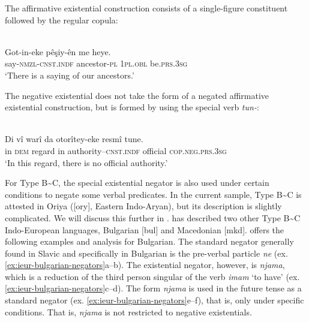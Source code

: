 \documentclass[output=paper,colorlinks,citecolor=brown]{langscibook}
\begin{document}
%
The affirmative existential construction consists of a single-figure constituent followed by the regular copula:
%
\begin{exe}\ex\label{ex:ieur-kurmanji-ancestors}
\\
    \gll Got-in-eke pêşiy-ên      me   heye.  \\
say-\textsc{nmzl}-\textsc{cnst.}\textsc{indf} ancestor-\textsc{pl} \textsc{1pl.obl}   be.\textsc{prs.3sg} \\
    \glt `There is a saying of our ancestors.' 
    \end{exe}
%
The negative existential does not take the form of a negated affirmative existential construction, but is formed by using the special verb \textit{tun-}:
%
\begin{exe}\ex\label{ex:ieur-kurmanji-authority}
\\
    \gll Di vî warî    da otorîtey-eke resmî   tune.  \\
in  \textsc{dem}    regard in  authority--\textsc{cnst.}\textsc{indf}  official \textsc{cop.neg.prs.3sg} \\
    \glt `In this regard, there is no official authority.' 
    \end{exe}
%
For Type B{\textasciitilde}C, the special existential negator is also used
under certain conditions to negate some verbal predicates. In the current
sample, Type B{\textasciitilde}C is attested in Oriya ([ory], Eastern
Indo-Aryan), but its description is slightly complicated. We will discuss
this further in . \citet{Veselinova2014} has
described two other Type B{\textasciitilde}C Indo-European languages,
Bulgarian [bul] and Macedonian [mkd]. \citet[1332--1333]{Veselinova2014}
offers the following examples and analysis for Bulgarian. The standard
negator generally found in Slavic and specifically in Bulgarian is the
pre-verbal particle \textit{ne} (ex.
\ref{ex:ieur-bulgarian-negators}a--b). The existential negator,
however, is \textit{njama}, which is a reduction of the third person
singular of the verb \textit{imam} `to have' (ex.
\ref{ex:ieur-bulgarian-negators}c--d). The form
\textit{njama} is used in the future tense as a standard negator (ex.
\ref{ex:ieur-bulgarian-negators}e--f), that is, only under specific conditions. That is, \textit{njama} is
not restricted to negative existentials.
%
\end{document}
